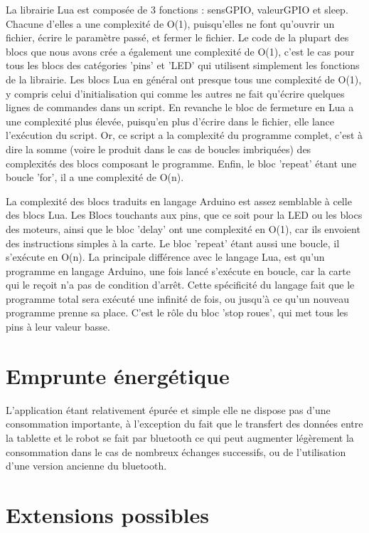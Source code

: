 \documentclass[12pt,francais]{report}
\begin{document}
\bigskip
La librairie Lua est composée de 3 fonctions : sensGPIO, valeurGPIO et sleep. Chacune d'elles a une complexité de O(1), puisqu'elles ne font qu'ouvrir un fichier, écrire le paramètre passé, et fermer le fichier.
Le code de la plupart des blocs que nous avons crée a également une complexité de O(1), c'est le cas pour tous les blocs des catégories 'pins' et 'LED' qui utilisent simplement les fonctions de la librairie. Les blocs Lua en général ont  presque tous une complexité de O(1), y compris celui d'initialisation qui comme les autres ne fait qu'écrire quelques lignes de commandes dans un script. En revanche le bloc de fermeture en Lua a une complexité plus élevée, puisqu'en plus d'écrire dans le fichier, elle lance l'exécution du script. Or, ce script a la complexité du programme complet, c'est à dire la somme (voire le produit dans le cas de boucles imbriquées) des complexités des blocs composant le programme. Enfin, le bloc 'repeat' étant une boucle 'for', il a une complexité de O(n).

\bigskip
La complexité des blocs traduits en langage Arduino est assez semblable à celle des blocs Lua. Les Blocs touchants aux pins, que ce soit pour la LED ou les blocs des moteurs, ainsi que le bloc 'delay' ont une complexité en O(1), car ils envoient des instructions simples à la carte. Le bloc 'repeat' étant aussi une boucle, il s'exécute en O(n).
La principale différence avec le langage Lua, est qu'un programme en langage Arduino, une fois lancé s'exécute en boucle, car la carte qui le reçoit n'a pas de condition d'arrêt. Cette spécificité du langage fait que le programme total sera exécuté une infinité de fois, ou jusqu'à ce qu'un nouveau programme prenne sa place. C'est le rôle du bloc 'stop roues', qui met tous les pins à leur valeur basse. 

\section*{Emprunte énergétique}

L'application étant relativement épurée et simple elle ne dispose pas d'une consommation importante, à l'exception du fait que le transfert des données entre la tablette et le robot se fait par bluetooth ce qui peut augmenter légèrement la consommation dans le cas de nombreux échanges successifs, ou de l'utilisation d'une version ancienne du bluetooth.

\section*{Extensions possibles}
\end{document}
